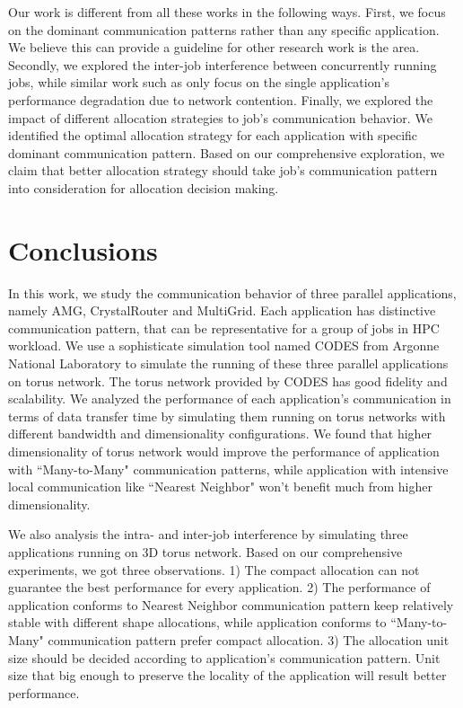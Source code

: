 \documentclass[conference]{IEEEtran}
\begin{document}
Our work is different from all these works in the following ways. First, we focus on the dominant communication patterns rather than any specific application. We believe this can provide a guideline for other research work is the area. Secondly, we explored the inter-job interference between concurrently running jobs, while similar work such as \cite{abhinav-sc13} only focus on the single application's performance degradation due to network contention. Finally, we explored the impact of different allocation strategies to job's communication behavior. We identified the optimal allocation strategy for each application with specific dominant communication pattern. Based on our comprehensive exploration, we claim that better allocation strategy should take job's communication pattern into consideration for allocation decision making. 

\section{Conclusions}
\label{sec:conclusion}
In this work, we study the communication behavior of three parallel applications, namely AMG, CrystalRouter and MultiGrid. Each application has distinctive communication pattern, that can be representative for a group of jobs in HPC workload. We use a sophisticate simulation tool named CODES from Argonne National Laboratory to simulate the running of these three parallel applications on torus network. The torus network provided by CODES has good fidelity and scalability. We analyzed the performance of each application's communication in terms of data transfer time by simulating them running on torus networks with different bandwidth and dimensionality configurations. We found that higher dimensionality of torus network would improve the performance of application with ``Many-to-Many" communication patterns, while application with intensive local communication like ``Nearest Neighbor" won't benefit much from higher dimensionality.

We also analysis the intra- and inter-job interference by simulating three applications running on 3D torus network. Based on our comprehensive experiments, we got three observations. 1) The compact allocation can not guarantee the best performance for every application. 2) The performance of application conforms to Nearest Neighbor communication pattern keep relatively stable with different shape allocations, while application conforms to ``Many-to-Many" communication pattern prefer compact allocation. 3) The allocation unit size should be decided according to application's communication pattern. Unit size that big enough to preserve the locality of the application will result better performance. 
\end{document}
